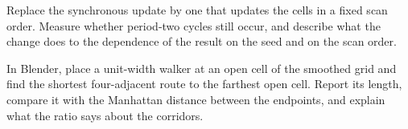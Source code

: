 \begin{exercise}
Replace the synchronous update by one that updates the cells in a fixed scan order. Measure whether period-two cycles still occur, and describe what the change does to the dependence of the result on the seed and on the scan order.
\end{exercise}

\begin{exercise}[16.4: Walk it]
In Blender, place a unit-width walker at an open cell of the smoothed grid and find the shortest four-adjacent route to the farthest open cell. Report its length, compare it with the Manhattan distance between the endpoints, and explain what the ratio says about the corridors.
\end{exercise}

